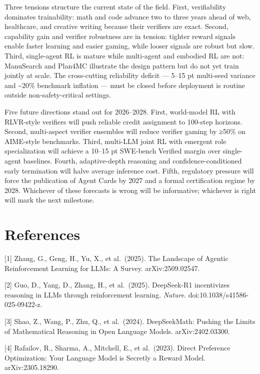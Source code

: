 Three tensions structure the current state of the field. First, verifiability dominates trainability: math and code advance two to three years ahead of web, healthcare, and creative writing because their verifiers are exact. Second, capability gain and verifier robustness are in tension: tighter reward signals enable faster learning and easier gaming, while looser signals are robust but slow. Third, single-agent RL is mature while multi-agent and embodied RL are not: ManuSearch and Plan4MC illustrate the design pattern but do not yet train jointly at scale. The cross-cutting reliability deficit --- 5--15 pt multi-seed variance and \textasciitilde20\% benchmark inflation --- must be closed before deployment is routine outside non-safety-critical settings.

Five future directions stand out for 2026--2028. First, world-model RL with RLVR-style verifiers will push reliable credit assignment to 100-step horizons. Second, multi-aspect verifier ensembles will reduce verifier gaming by ≥50\% on AIME-style benchmarks. Third, multi-LLM joint RL with emergent role specialization will achieve a 10--15 pt SWE-bench Verified margin over single-agent baselines. Fourth, adaptive-depth reasoning and confidence-conditioned early termination will halve average inference cost. Fifth, regulatory pressure will force the publication of Agent Cards by 2027 and a formal certification regime by 2028. Whichever of these forecasts is wrong will be informative; whichever is right will mark the next milestone.

\section{References}\label{references}

{[}1{]} Zhang, G., Geng, H., Yu, X., et al.~(2025). The Landscape of Agentic Reinforcement Learning for LLMs: A Survey. arXiv:2509.02547.

{[}2{]} Guo, D., Yang, D., Zhang, H., et al.~(2025). DeepSeek-R1 incentivizes reasoning in LLMs through reinforcement learning. \emph{Nature}. doi:10.1038/s41586-025-09422-z.

{[}3{]} Shao, Z., Wang, P., Zhu, Q., et al.~(2024). DeepSeekMath: Pushing the Limits of Mathematical Reasoning in Open Language Models. arXiv:2402.03300.

{[}4{]} Rafailov, R., Sharma, A., Mitchell, E., et al.~(2023). Direct Preference Optimization: Your Language Model is Secretly a Reward Model. arXiv:2305.18290.

